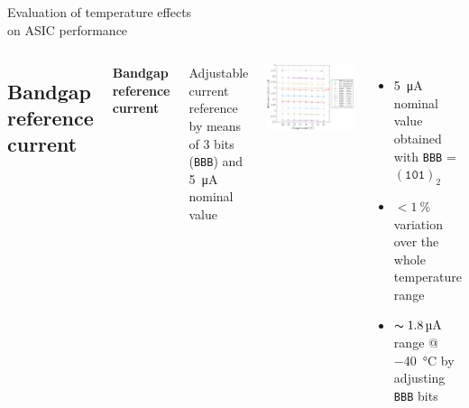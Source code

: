 \documentclass[aspectratio=169,xcolor=dvipsnames]{beamer}
\newcommand{\greencheck}{{\color{ForestGreen}\checkmark}}
\begin{document}
\begin{frame}{Evaluation of temperature effects \\ \vskip-0.15cm on ASIC performance}
\begin{columns}[T]
    \subsection{Bandgap reference current}
        \addtolength{\leftmargini}{\labelsep}
        \vskip0.3cm
        \textbf{Bandgap reference current}\\
        \vskip0.15cm
    
        Adjustable current reference by means of 3 bits (\texttt{BBB}) and \SI{5}{\micro\ampere} nominal value

        \vskip-0.4cm
        \begin{center}
            \includegraphics[height=0.48\textheight]{images/temperature_effects/BGR_current_Xtemp_all-BBB.pdf}
        \end{center}

        \vskip-0.2cm
        \begin{itemize}
            \item \SI{5}{\micro\ampere} nominal value obtained with \texttt{BBB} = $(\texttt{101})_{2}$ \greencheck
            \item $< \SI{1}{\percent}$ variation over the whole temperature range \greencheck
            \item $\thicksim \SI{1.8}{\micro\ampere}$ range @ \SI{-40}{\celsius} by adjusting \texttt{BBB} bits \greencheck
        \end{itemize}
    
    \end{columns}
\end{frame}
\end{document}

